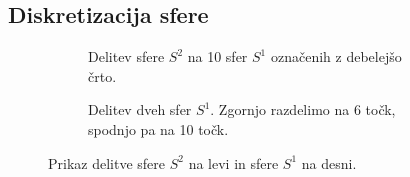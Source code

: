 \subsection{Diskretizacija sfere}




\begin{figure}[ht]
    \begin{subfigure}{0.49\textwidth}
        \centering
        
        \caption{Delitev sfere $S^2$ na 10 sfer $S^1$ označenih z debelejšo črto.}
        \label{fig:constructing_sphere_1}
    \end{subfigure}
    \hfill
    \begin{subfigure}{0.49\textwidth}
        \centering
        
        \caption{Delitev dveh sfer $S^1$. Zgornjo razdelimo na 6 točk, spodnjo pa na 10 točk.}
        \label{fig:constructing_sphere_2}
    \end{subfigure}
    \caption{Prikaz delitve sfere $S^2$ na levi in sfere $S^1$ na desni.}
    \label{fig:constructing_sphere}
\end{figure}

